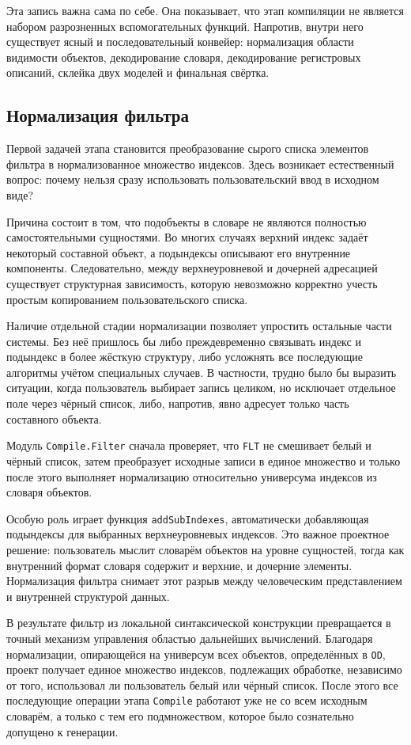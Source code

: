 \documentclass[a4paper,12pt]{article}
\begin{document}
Эта запись важна сама по себе. Она показывает, что этап компиляции не является набором
разрозненных вспомогательных функций. Напротив, внутри него существует ясный и
последовательный конвейер: нормализация области видимости объектов, декодирование
словаря, декодирование регистровых описаний, склейка двух моделей и финальная свёртка.

\subsection{Нормализация фильтра}

Первой задачей этапа становится преобразование сырого списка элементов фильтра в
нормализованное множество индексов. Здесь возникает естественный вопрос: почему нельзя
сразу использовать пользовательский ввод в исходном виде?

Причина состоит в том, что подобъекты в словаре не являются полностью самостоятельными
сущностями. Во многих случаях верхний индекс задаёт некоторый составной объект, а
подындексы описывают его внутренние компоненты. Следовательно, между верхнеуровневой и
дочерней адресацией существует структурная зависимость, которую невозможно корректно
учесть простым копированием пользовательского списка.

Наличие отдельной стадии нормализации позволяет упростить остальные части системы. Без
неё пришлось бы либо преждевременно связывать индекс и подындекс в более жёсткую
структуру, либо усложнять все последующие алгоритмы учётом специальных случаев. В
частности, трудно было бы выразить ситуации, когда пользователь выбирает запись целиком,
но исключает отдельное поле через чёрный список, либо, напротив, явно адресует только
часть составного объекта.

Модуль \texttt{Compile.Filter} сначала проверяет,
что \texttt{FLT} не смешивает белый и чёрный список, затем преобразует исходные записи в
единое множество и только после этого выполняет нормализацию относительно универсума
индексов из словаря объектов.

Особую роль играет функция \texttt{addSubIndexes}, автоматически добавляющая подындексы
для выбранных верхнеуровневых индексов. Это важное проектное решение: пользователь
мыслит словарём объектов на уровне сущностей, тогда как внутренний формат словаря
содержит и верхние, и дочерние элементы. Нормализация фильтра снимает этот разрыв между
человеческим представлением и внутренней структурой данных.

В результате фильтр из локальной синтаксической конструкции превращается в точный
механизм управления областью дальнейших вычислений. Благодаря нормализации,
опирающейся на универсум всех объектов, определённых в \texttt{OD}, проект получает
единое множество индексов, подлежащих обработке, независимо от того, использовал ли
пользователь белый или чёрный список. После этого все последующие операции
этапа \texttt{Compile} работают уже не со всем исходным словарём, а только с тем его
подмножеством, которое было сознательно допущено к генерации.
\end{document}
